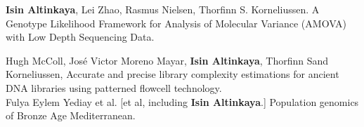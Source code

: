 \documentclass[letterpaper,10.5pt]{article}
\begin{document}
\medskip
\textbf{Isin Altinkaya}, Lei Zhao, Rasmus Nielsen, Thorfinn S. Korneliussen. A Genotype Likelihood Framework for Analysis of Molecular Variance (AMOVA) with Low Depth Sequencing Data. \\

\medskip

Hugh McColl, Jos\'e Victor Moreno Mayar, \textbf{Isin Altinkaya}, Thorfinn Sand Korneliussen, Accurate and precise library complexity estimations for ancient DNA libraries using patterned flowcell technology. \\

Fulya Eylem Yediay et al. [et al, including \textbf{Isin Altinkaya}.]  Population genomics of Bronze Age Mediterranean. \\




\end{document}
